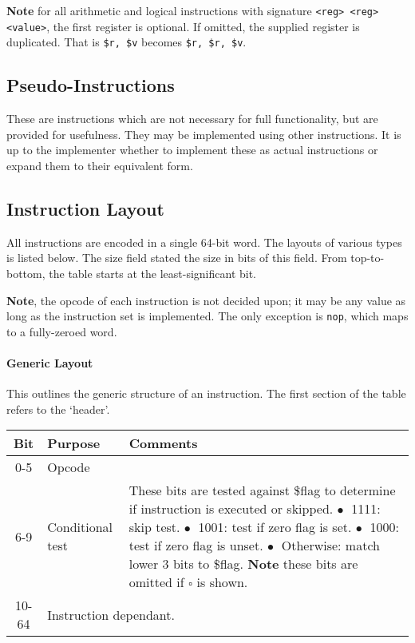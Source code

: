 \documentclass{article}
\begin{document}
\textbf{Note} for all arithmetic and logical instructions with signature \texttt{<reg> <reg> <value>}, the first register is optional.
If omitted, the supplied register is duplicated.
That is \texttt{\$r, \$v} becomes \texttt{\$r, \$r, \$v}.

\subsection{Pseudo-Instructions}

These are instructions which are not necessary for full functionality, but are provided for usefulness.
They may be implemented using other instructions.
It is up to the implementer whether to implement these as actual instructions or expand them to their equivalent form.

\subsection{Instruction Layout}

All instructions are encoded in a single 64-bit word.
The layouts of various types is listed below.
The size field stated the size in bits of this field.
From top-to-bottom, the table starts at the least-significant bit.

\textbf{Note}, the opcode of each instruction is not decided upon; it may be any value as long as the instruction set is implemented.
The only exception is \texttt{nop}, which maps to a fully-zeroed word.

\paragraph{Generic Layout}
This outlines the generic structure of an instruction.
The first section of the table refers to the `header'.

\bigskip
\begin{tabular}{|c|l|l|}
    \hline
    \textbf{Bit} & \textbf{Purpose} & \textbf{Comments} \\
    \hline
    0-5 & Opcode & \\
    \hline
    6-9 & Conditional test & \makecell[l]{These bits are tested against \$flag to determine if instruction is executed or skipped.\\%
    \(\bullet\;\) 1111: skip test.\\%
    \(\bullet\;\) 1001: test if zero flag is set.\\%
    \(\bullet\;\) 1000: test if zero flag is unset.\\%
    \(\bullet\;\) Otherwise: match lower 3 bits to \$flag.\\%
    \textbf{Note} these bits are omitted if \(\square\) is shown.} \\
    \hline
    \hline
    10-64 & \multicolumn{2}{l|}{Instruction dependant.} \\
    \hline
\end{tabular}
\end{document}
